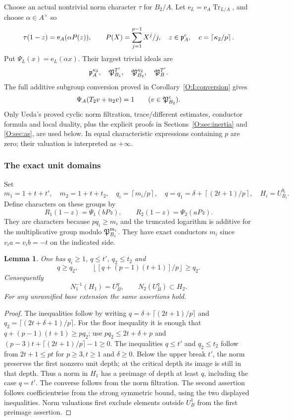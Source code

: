 \documentclass[11pt]{amsart}
\newtheorem{lemma}[theorem]{Lemma}
\theoremstyle{definition}
\theoremstyle{remark}
\newcommand{\Tr}{\operatorname{Tr}}
\newcommand{\ceil}[1]{\left\lceil #1\right\rceil}
\newcommand{\floor}[1]{\left\lfloor #1\right\rfloor}
\begin{document}
Choose an actual nontrivial norm character $\tau$ for $B_2/A$.
Let $\mathrm e_L=\mathrm e_A\Tr_{L/A}$, and choose $\alpha\in A^\times$ so
\[
 \tau(1-z)=\mathrm e_A(\alpha P(z)),\qquad
 P(X)=\sum_{j=1}^{p-1}X^j/j,\quad z\in\pp_A^c,\quad c=\ceil{\kappa_2/p}.
\]
Put $\Psi_L(x)=\mathrm e_L(\alpha x)$. Their largest trivial ideals are
\[
 \mathfrak p_A^{\kappa_2},\quad\mathfrak P_{B_1}^{T'},\quad\mathfrak P_{B_2}^{\kappa_2},\quad\mathfrak P_B^{T'}.
\]
The full additive subgroup conversion proved in Corollary~\ref{O:I:conversion} gives
\begin{equation}\label{O:M:conversion}
 \Psi_A(T_2v+n_2v)=1\qquad(v\in\mathfrak P_{B_2}^c).
\end{equation}
Only Ueda's proved cyclic norm filtration, trace/different estimates,
conductor formula and local duality, plus the explicit proofs in
Sections~\ref{O:sec:inertia} and \ref{O:sec:as}, are used below. In equal characteristic expressions
containing $p$ are zero; their valuation is interpreted as $+\infty$.

\subsubsection*{The exact unit domains}
Set
\[
 m_1=1+t+t',\quad m_2=1+t+t_2,\quad
 q_i=\ceil{m_i/p},\quad q=q_1=\delta+\ceil{(2t+1)/p},
 \quad H_i=U_{B_i}^{q_i}.
\]
Define characters on these groups by
\begin{equation}\label{O:M:models}
 R_1(1-z)=\Psi_1(bPz),\qquad R_2(1-z)=\Psi_2(aPz).
\end{equation}
They are characters because $pq_i\ge m_i$ and the truncated logarithm
is additive for the multiplicative group modulo $\mathfrak P_{B_i}^{m_i}$.
They have exact conductors $m_i$ since $v_i a=v_i b=-t$ on the indicated side.

\begin{lemma}\label{O:M:domains}
One has $q_i\ge1$, $q\le t'$, $q_2\le t_2$ and
\[
 q\ge q_2,\qquad
 \floor{[q+(p-1)(t+1)]/p}\ge q_2.
\]
Consequently
\begin{equation}\label{O:M:preimage}
 N_1^{-1}(H_1)=U_B^q,\qquad N_2(U_B^q)\subset H_2.
\end{equation}
For any unramified base extension the same assertions hold.
\end{lemma}
\begin{proof}
The inequalities follow by writing $q=\delta+\lceil(2t+1)/p\rceil$ and
$q_2=\lceil(2t+\delta+1)/p\rceil$. For the floor inequality it is enough
that $q+(p-1)(t+1)\ge pq_2$; use $pq_2\le2t+\delta+p$ and
$(p-3)t+\lceil(2t+1)/p\rceil-1\ge0$.
The inequalities $q\le t'$ and $q_2\le t_2$ follow from
$2t+1\le pt$ for $p\ge3,t\ge1$ and $\delta\ge0$.
Below the upper break $t'$, the norm preserves the first nonzero unit
depth; at the critical depth its image is still in that depth.
Thus a norm in $H_1$ has a preimage of depth at least $q$, including
the case $q=t'$. The converse follows from the norm filtration.
The second assertion follows coefficientwise from the strong symmetric
bound, using the two displayed inequalities. Norm valuations first
exclude elements outside $U_B^1$ from the first preimage assertion.
\end{proof}
\end{document}
